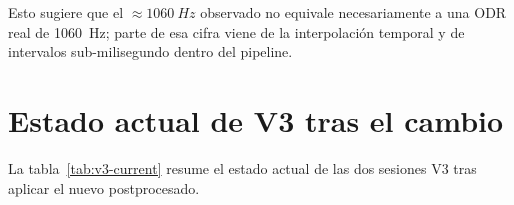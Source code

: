 \documentclass[11pt,a4paper]{article}
\begin{document}
Esto sugiere que el \(\approx \SI{1060}{Hz}\) observado no equivale necesariamente a una ODR real de \SI{1060}{Hz}; parte de esa cifra viene de la interpolaci\'on temporal y de intervalos sub-milisegundo dentro del pipeline.

\section{Estado actual de V3 tras el cambio}
La tabla~\ref{tab:v3-current} resume el estado actual de las dos sesiones V3 tras aplicar el nuevo postprocesado.

\begin{table}[h!]
\centering
\small
{}
\caption{M\'etricas principales de captura y movimiento sobre los JSON V3.}
\label{tab:v3-current}
\end{table}

\begin{table}[h!]
\centering
\small
{}
\caption{Separaci\'on entre endpoint activo y posici\'on asentada final tras estabilizaci\'on.}
\end{table}
\end{document}
